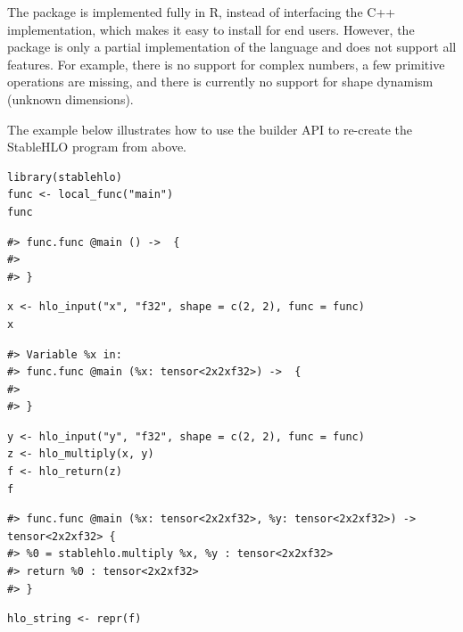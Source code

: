 The package is implemented fully in R, instead of interfacing the C++ implementation, which makes it easy to install for end users.
However, the  package is only a partial implementation of the language and does not support all features.
For example, there is no support for complex numbers, a few primitive operations are missing, and there is currently no support for shape dynamism (unknown dimensions).

The example below illustrates how to use the builder API to re-create the StableHLO program from above.

\begin{verbatim}
library(stablehlo)
func <- local_func("main")
func
\end{verbatim}

\begin{verbatim}
#> func.func @main () ->  {
#> 
#> }
\end{verbatim}

\begin{verbatim}
x <- hlo_input("x", "f32", shape = c(2, 2), func = func)
x
\end{verbatim}

\begin{verbatim}
#> Variable %x in:
#> func.func @main (%x: tensor<2x2xf32>) ->  {
#> 
#> }
\end{verbatim}

\begin{verbatim}
y <- hlo_input("y", "f32", shape = c(2, 2), func = func)
z <- hlo_multiply(x, y)
f <- hlo_return(z)
f
\end{verbatim}

\begin{verbatim}
#> func.func @main (%x: tensor<2x2xf32>, %y: tensor<2x2xf32>) -> tensor<2x2xf32> {
#> %0 = stablehlo.multiply %x, %y : tensor<2x2xf32>
#> return %0 : tensor<2x2xf32>
#> }
\end{verbatim}

\begin{verbatim}
hlo_string <- repr(f)
\end{verbatim}

